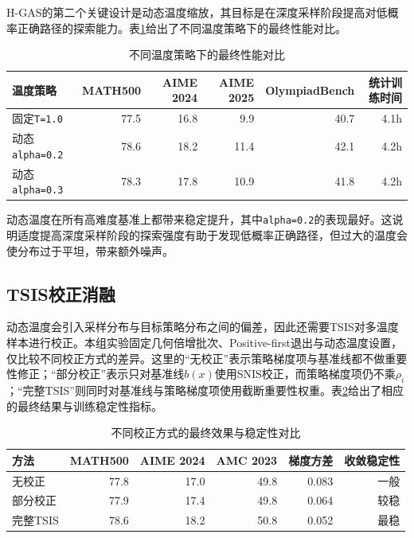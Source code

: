 H-GAS的第二个关键设计是动态温度缩放，其目标是在深度采样阶段提高对低概率正确路径的探索能力。表\ref{tab:exp_ablation_temp_table}给出了不同温度策略下的最终性能对比。

\begin{table}[htbp]
    \centering
    \caption{不同温度策略下的最终性能对比}\label{tab:exp_ablation_temp_table}
    \small
    \setlength{\tabcolsep}{3.2pt}
    \renewcommand{\arraystretch}{1.15}
    \begin{tabular}{|l|r|r|r|r|r|}
    \hline
    \textbf{温度策略} & \textbf{MATH500} & \textbf{AIME 2024} & \textbf{AIME 2025} & \textbf{OlympiadBench} & \textbf{统计训练时间} \\
    \hline
    固定\texttt{T=1.0}     & 77.5 & 16.8 & 9.9  & 40.7 & 4.1h \\
    动态\texttt{alpha=0.2} & 78.6 & 18.2 & 11.4 & 42.1 & 4.2h \\
    动态\texttt{alpha=0.3} & 78.3 & 17.8 & 10.9 & 41.8 & 4.2h \\
    \hline
    \end{tabular}
\end{table}

动态温度在所有高难度基准上都带来稳定提升，其中\texttt{alpha=0.2}的表现最好。这说明适度提高深度采样阶段的探索强度有助于发现低概率正确路径，但过大的温度会使分布过于平坦，带来额外噪声。

\subsection{TSIS校正消融}
\label{subsec:exp_ablation_tsis}

动态温度会引入采样分布与目标策略分布之间的偏差，因此还需要TSIS对多温度样本进行校正。本组实验固定几何倍增批次、Positive-first退出与动态温度设置，仅比较不同校正方式的差异。这里的“无校正”表示策略梯度项与基准线都不做重要性修正；“部分校正”表示只对基准线$b(x)$使用SNIS校正，而策略梯度项仍不乘$\rho_i$；“完整TSIS”则同时对基准线与策略梯度项使用截断重要性权重。表\ref{tab:exp_ablation_tsis_table}给出了相应的最终结果与训练稳定性指标。

\begin{table}[htbp]
    \centering
    \caption{不同校正方式的最终效果与稳定性对比}\label{tab:exp_ablation_tsis_table}
    \small
    \setlength{\tabcolsep}{3.2pt}
    \renewcommand{\arraystretch}{1.15}
    \begin{tabular}{|l|r|r|r|r|r|}
    \hline
    \textbf{方法} & \textbf{MATH500} & \textbf{AIME 2024} & \textbf{AMC 2023} & \textbf{梯度方差} & \textbf{收敛稳定性} \\
    \hline
    无校正      & 77.8 & 17.0 & 49.8 & 0.083 & 一般 \\
    部分校正    & 77.9 & 17.4 & 49.8 & 0.064 & 较稳 \\
    完整TSIS    & 78.6 & 18.2 & 50.8 & 0.052 & 最稳 \\
    \hline
    \end{tabular}
\end{table}


